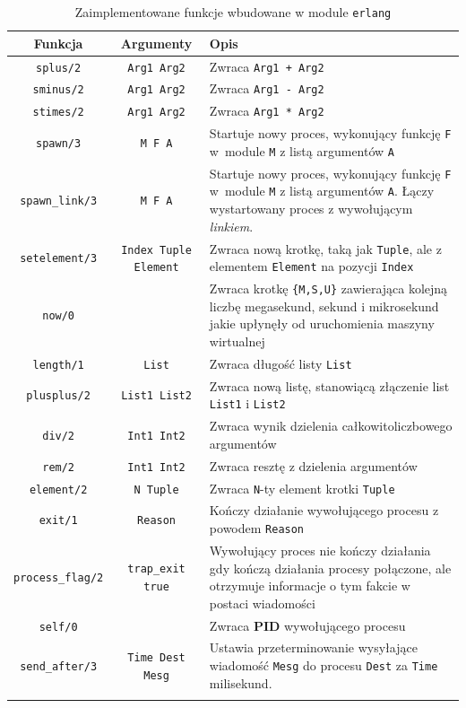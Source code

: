 \begin{longtable}{|c|c|p{7.5cm}|}
\hline

Funkcja & Argumenty & Opis \\
\endfirsthead
\hline
\texttt{splus/2} & \texttt{Arg1 Arg2} & Zwraca \texttt{Arg1 + Arg2} \\
\hline
\texttt{sminus/2} & \texttt{Arg1 Arg2} & Zwraca \texttt{Arg1 - Arg2} \\
\hline
\texttt{stimes/2} & \texttt{Arg1 Arg2} & Zwraca \texttt{Arg1 * Arg2} \\
\hline
\texttt{spawn/3} & \texttt{M F A} & Startuje nowy proces, wykonujący funkcję \texttt{F} w~module \texttt{M} z listą argumentów \texttt{A} \\
\hline
\texttt{spawn\_link/3} & \texttt{M F A} & Startuje nowy proces, wykonujący funkcję \texttt{F} w~module \texttt{M} z listą argumentów \texttt{A}. Łączy wystartowany proces z wywołującym \emph{linkiem}.\\
\hline
\texttt{setelement/3} & \texttt{Index Tuple Element} & Zwraca nową krotkę, taką jak \texttt{Tuple}, ale z elementem \texttt{Element} na pozycji \texttt{Index} \\
\hline
\texttt{now/0} & & Zwraca krotkę \texttt{\{M,S,U\}} zawierająca kolejną liczbę megasekund, sekund i mikrosekund jakie upłynęły od uruchomienia maszyny wirtualnej \\
\hline
\texttt{length/1} & \texttt{List} & Zwraca długość listy \texttt{List} \\
\hline
\texttt{plusplus/2} & \texttt{List1 List2} & Zwraca nową listę, stanowiącą złączenie list \texttt{List1} i \texttt{List2} \\
\hline
\texttt{div/2} & \texttt{Int1 Int2} & Zwraca wynik dzielenia całkowitoliczbowego argumentów \\
\hline
\texttt{rem/2} & \texttt{Int1 Int2} & Zwraca resztę z dzielenia argumentów \\
\hline
\texttt{element/2} & \texttt{N Tuple} & Zwraca \texttt{N}-ty element krotki \texttt{Tuple} \\
\hline
\texttt{exit/1} & \texttt{Reason} & Kończy działanie wywołującego procesu z powodem \texttt{Reason} \\
\hline
\texttt{process\_flag/2} & \texttt{trap\_exit true} & Wywołujący proces nie kończy działania gdy kończą działania procesy połączone, ale otrzymuje informacje o tym fakcie w postaci wiadomości \\
\hline
\texttt{self/0} & & Zwraca \textbf{PID} wywołującego procesu \\
\hline
\texttt{send\_after/3} & \texttt{Time Dest Mesg} & Ustawia przeterminowanie wysyłające wiadomość \texttt{Mesg} do procesu \texttt{Dest} za \texttt{Time} milisekund. \\
\hline
\caption{Zaimplementowane funkcje wbudowane w module \texttt{erlang}} 
\label{table:bifErlang} \\
\end{longtable}


